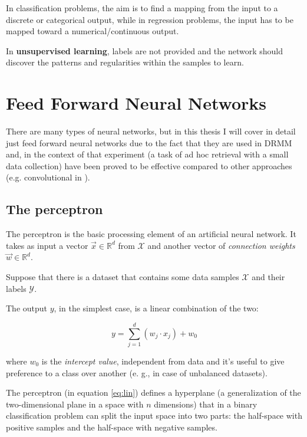 In classification problems, the aim is to find a mapping from the input to a discrete or categorical output, while in regression problems, the input has to be mapped toward a numerical/continuous output.

In \textbf{unsupervised learning}, labels are not provided and the network should discover the patterns and regularities within the samples to learn.

\section{Feed Forward Neural Networks}

There are many types of neural networks, but in this thesis I will cover in detail just feed forward neural networks due to the fact that they are used in DRMM \cite{drmm} and, in the context of that experiment (a task of ad hoc retrieval with a small data collection) have been proved to be effective compared to other approaches (e.g. convolutional in \cite{cdssm}).

\subsection{The perceptron}

The perceptron is the basic processing element of an artificial neural network. It takes as input a vector $\vec{x} \in \mathbb{R}^d$ from $\mathcal{X}$ and another vector of \textit{connection weights} $\vec{w} \in \mathbb{R}^d$.

Suppose that there is a dataset that contains some data samples $\mathcal{X}$ and their labels $\mathcal{Y}$.

The output $y$, in the simplest case, is a linear combination of the two:

\begin{equation}
\label{eq:lin}
\tag{linear combiner}
y = \sum_{j = 1}^d (w_j \cdot x_j) + w_0
\end{equation}

where $w_0$ is the \textit{intercept value}, independent from data and it's useful to give preference to a
class over another (e. g., in case of unbalanced datasets).

The perceptron (in equation \ref{eq:lin}) defines a hyperplane (a generalization of the two-dimensional plane in a space with $n$ dimensions) that in a binary classification problem can split the input space into two parts: the half-space with positive samples and the half-space with negative samples.

